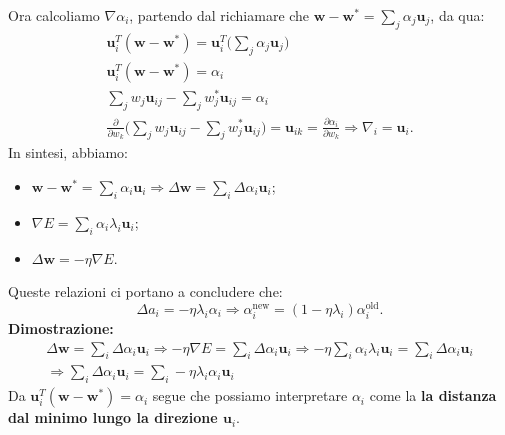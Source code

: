 Ora calcoliamo $\nabla\alpha_i$, partendo dal richiamare che $\textbf{w}-\textbf{w}^*=\sum_j\alpha_j\textbf{u}_j$, da qua:
\begin{equation}
    \begin{split}
        \textbf{u}_i^T(\textbf{w}-\textbf{w}^*)=\textbf{u}^T_i\Big( \sum_j\alpha_j\textbf{u}_j \Big)\\
        \textbf{u}_i^T(\textbf{w}-\textbf{w}^*)=\alpha_i\\
        \sum_jw_j\textbf{u}_{ij}-\sum_jw^*_j\textbf{u}_{ij}=\alpha_i\\
        \frac{\partial}{\partial w_k}\Big( \sum_jw_j\textbf{u}_{ij}-\sum_jw^*_j\textbf{u}_{ij} \Big)=\textbf{u}_{ik} =  \frac{\partial \alpha_i}{\partial w_k} \Rightarrow \nabla_i=\textbf{u}_i.
    \end{split}
\end{equation}
In sintesi, abbiamo:
\begin{itemize}
    \item $\textbf{w}-\textbf{w}^*=\sum_i\alpha_i\textbf{u}_i\Rightarrow \Delta\textbf{w}=\sum_i\Delta\alpha_i\textbf{u}_i$;
    \item $\nabla E=\sum_i\alpha_i\lambda_i\textbf{u}_i$;
    \item $\Delta\textbf{w}=-\eta\nabla E$.
\end{itemize}
Queste relazioni ci portano a concludere che:
\begin{equation}
    \Delta a_i=-\eta\lambda_i\alpha_i\Rightarrow\alpha^{\text{new}}_i=(1-\eta\lambda_i)\alpha^{\text{old}}_i.
\end{equation}
\textbf{Dimostrazione:}
\begin{equation}
\begin{split}
    \Delta \textbf{w}=\sum_i\Delta\alpha_i\textbf{u}_i\Rightarrow-\eta\nabla E =\sum_i\Delta\alpha_i\textbf{u}_i\Rightarrow-\eta\sum_i\alpha_i\lambda_i\textbf{u}_i=\sum_i\Delta\alpha_i\textbf{u}_i \\
    \Rightarrow\sum_i\Delta\alpha_i\textbf{u}_i =\sum_i-\eta\lambda_i\alpha_i\textbf{u}_i
\end{split}
\end{equation}
Da $\textbf{u}^T_i(\textbf{w}-\textbf{w}^*)=\alpha_i$ segue che possiamo interpretare $\alpha_i$ come la \textbf{la distanza dal minimo lungo la direzione $\textbf{u}_i$}.


